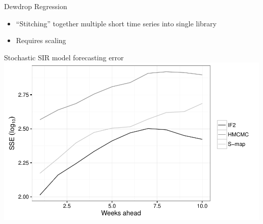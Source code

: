 \documentclass[12pt]{beamer}
\begin{document}
\begin{frame}

	Dewdrop Regression
	\vspace{\baselineskip}

	\begin{itemize}
		\item ``Stitching'' together multiple short time series into single library
		\item Requires scaling
	\end{itemize}

\end{frame}

\begin{frame}

	\null
	\vfill
	Stochastic SIR model forecasting error \\
	\vspace{\baselineskip}
	\includegraphics[width=\textwidth,height=\textheight,keepaspectratio=true]{../../writing/SPATIAL/images/sseplot}
	\vfill

\end{frame}
\end{document}
